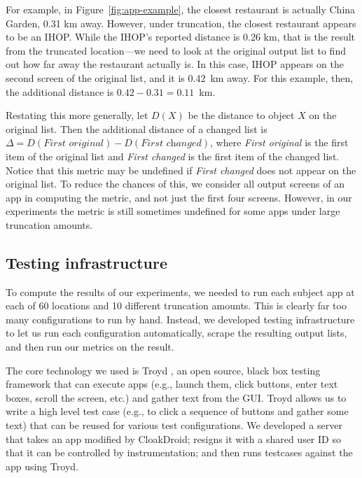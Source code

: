 \documentclass[10pt, conference, compsocconf]{IEEEtran}
\newcommand{\comment}[3][\color{red}]{{#1{[{#2}: {#3}]}}}
\newcommand{\jeff}[1]{\comment[\color{green}]{JSF}{#1}}
\newcommand{\fuzzer}{CloakDroid\xspace}
\begin{document}
{For example, in Figure~\ref{fig:app-example}, the closest restaurant
is actually China Garden, 0.31 km away. However, under truncation, the
closest restaurant appears to be an IHOP. While the IHOP's reported
distance is 0.26 km, that is the result from the truncated
location---we need to look at the original output list to find out how
far away the restaurant actually is. In this case, IHOP appears on the
second screen of the original list, and it is 0.42~km
away. For this example, then, the additional distance is $0.42 - 0.31
= 0.11$~km.


Restating this more generally, let $D(X)$ be the distance to object
$X$ on the original list. Then the additional distance of a changed
list is $\Delta = D(\textit{First original}) - D(\textit{First changed})$, where
\textit{First original} is the first item of the original list and
\textit{First changed} is the first item of the changed list. Notice
that this metric may be undefined if \emph{First changed} does not
appear on the original list. To reduce the chances of this, we
consider all output screens of an app in computing the metric, and not
just the first four screens. However, in our experiments the metric is
still sometimes undefined for some apps under large truncation amounts.

\subsection{Testing infrastructure}

To compute the results of our experiments, we needed to run each
subject app at each of 60 locations and 10 different truncation
amounts. This is clearly far too many configurations to run by
hand. Instead, we developed testing infrastructure to let us run each
configuration automatically, scrape the resulting output lists, and
then run our metrics on the result.

The core technology we used is Troyd \cite{jsjeon:troyd}, an open source,
black box testing framework that can execute apps (e.g., launch them,
click buttons, enter text boxes, scroll the screen, etc.) and gather
text from the GUI. 
Troyd allows us to write a high level test case (e.g., to click a sequence of
buttons and gather some text) that can be reused for various test 
configurations.
We developed a server that takes an app modified by
\fuzzer{}; resigns it with a shared user ID so that it
can be controlled by instrumentation; and then runs testcases against
the app using Troyd.

}
\end{document}

